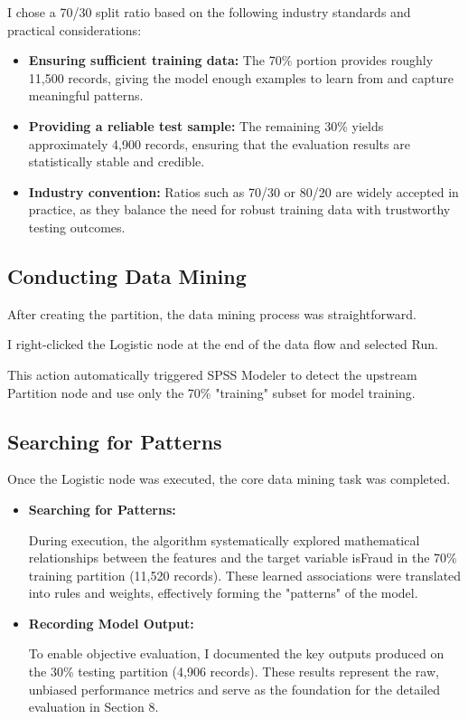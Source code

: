 \documentclass[sigplan,screen]{acmart}
\begin{document}
I chose a 70/30 split ratio based on the following industry standards and practical considerations:

\begin{itemize}
    \item \textbf{Ensuring sufficient training data:} The 70\% portion provides roughly 11,500 records, giving the model enough examples to learn from and capture meaningful patterns.
    
    \item \textbf{Providing a reliable test sample:} The remaining 30\% yields approximately 4,900 records, ensuring that the evaluation results are statistically stable and credible.
    
    \item \textbf{Industry convention:} Ratios such as 70/30 or 80/20 are widely accepted in practice, as they balance the need for robust training data with trustworthy testing outcomes.
\end{itemize}

\subsection{Conducting Data Mining}

After creating the partition, the data mining process was straightforward.

I right-clicked the Logistic node at the end of the data flow and selected Run.

This action automatically triggered SPSS Modeler to detect the upstream Partition node and use only the 70\% "training" subset for model training.

\subsection{Searching for Patterns}

Once the Logistic node was executed, the core data mining task was completed.

\begin{itemize}
    \item \textbf{Searching for Patterns:}
    
    During execution, the algorithm systematically explored mathematical relationships between the features and the target variable isFraud in the 70\% training partition (11,520 records). These learned associations were translated into rules and weights, effectively forming the "patterns" of the model.
    
    \item \textbf{Recording Model Output:}
    
    To enable objective evaluation, I documented the key outputs produced on the 30\% testing partition (4,906 records). These results represent the raw, unbiased performance metrics and serve as the foundation for the detailed evaluation in Section 8.
\end{itemize}
\end{document}
